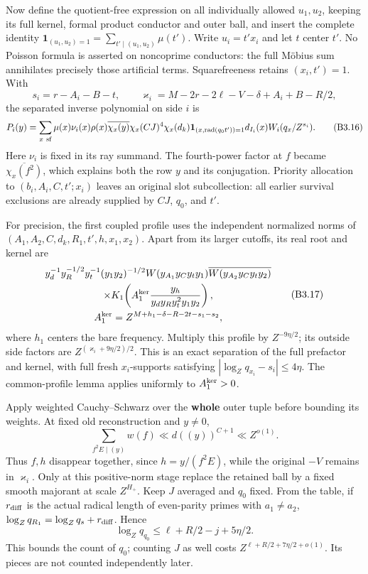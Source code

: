 \documentclass[11pt,a4paper]{article}
\begin{document}
Now define the quotient-free expression on all individually allowed
\(u_1,\allowbreak{}u_2\), keeping its full kernel, formal product conductor and outer
ball, and insert the complete identity
\(\mathbf1_{(u_1,\allowbreak{}u_2)=1}=\sum_{t'\mid(u_1,\allowbreak{}u_2)}\mu(t')\). Write
\(u_i=t'x_i\) and let \(t\) center \(t'\). No Poisson formula is
asserted on noncoprime conductors: the full Möbius sum annihilates
precisely those artificial terms. Squarefreeness retains \((x_i,\allowbreak{}t')=1\).
With \[
s_i=r-A_i-B-t,\qquad
\varkappa_i=M-2r-2\ell-V-\delta+A_i+B-R/2,
\tag{B3.15}
\] the separated inverse polynomial on side \(i\) is \[
P_i(y)=\sum_{x\ {\rm sf}}\mu(x)\nu_i(x)\rho(x)
 \overline{\chi_x(y)}\chi_x(CJ)^4\chi_x(d_k)
 \mathbf1_{(x,\operatorname{rad}(q_0t'))=1}d_{I_i}(x)W_i(q_x/Z^{s_i}).
\tag{B3.16}
\] Here \(\nu_i\) is fixed in its ray summand. The fourth-power factor
at \(f\) became \(\overline{\chi_x(f^2)}\), which explains both the row
\(y\) and its conjugation. Priority allocation to \((b_i,\allowbreak{}A_i,\allowbreak{}C,\allowbreak{}t';x_i)\)
leaves an original slot subcollection: all earlier survival exclusions
are already supplied by \(CJ\), \(q_0\), and \(t'\).

For precision, the first coupled profile uses the independent normalized
norms of \((A_1,\allowbreak{}A_2,\allowbreak{}C,\allowbreak{}d_k,\allowbreak{}R_1,\allowbreak{}t',\allowbreak{}h,\allowbreak{}x_1,\allowbreak{}x_2)\). Apart from its larger
cutoffs, its real root and kernel are \[
\begin{gathered}
y_d^{-1}y_R^{-1/2}y_t^{-1}(y_1y_2)^{-1/2}
 W(y_{A_1}y_Cy_ty_1)\overline{W(y_{A_2}y_Cy_ty_2)}\\
\times K_1\!\left(A_1^{\rm ker}\frac{y_h}{y_dy_Ry_t^2y_1y_2}\right),
\\ A_1^{\rm ker}=Z^{M+h_1-\delta-R-2t-s_1-s_2},
\end{gathered}
\tag{B3.17}
\] where \(h_1\) centers the bare frequency. Multiply this profile by
\(Z^{-9\eta/2}\); its outside side factors are
\(Z^{(\varkappa_i+9\eta/2)/2}\). This is an exact separation of the full
prefactor and kernel, with full fresh \(x_i\)-supports satisfying
\(|\log_Zq_{x_i}-s_i|\le4\eta\). The common-profile lemma applies
uniformly to \(A_1^{\rm ker}>0\).

Apply weighted Cauchy--Schwarz over the \textbf{whole} outer tuple
before bounding its weights. At fixed old reconstruction and \(y\ne0\),
\[
\sum_{f^2E\mid(y)}w(f)\ll d((y))^{C+1}\ll Z^{o(1)}.
\tag{B3.18}
\] Thus \(f,\allowbreak{}h\) disappear together, since \(h=y/(f^2E)\), while the
original \(-V\) remains in \(\varkappa_i\). Only at this positive-norm
stage replace the retained ball by a fixed smooth majorant at scale
\(Z^{H_+}\). Keep \(J\) averaged and \(q_0\) fixed. From the table, if
\(r_{\rm diff}\) is the actual radical length of even-parity primes with
\(a_1\ne a_2\), \(\log_Zq_{R_1}=\log_Zq_s+r_{\rm diff}\). Hence \[
\log_Zq_{q_0}\le\ell+R/2-j+5\eta/2.
\tag{B3.19}
\] This bounds the count of \(q_0\); counting \(J\) as well costs
\(Z^{\ell+R/2+7\eta/2+o(1)}\). Its pieces are not counted independently
later.
\end{document}
